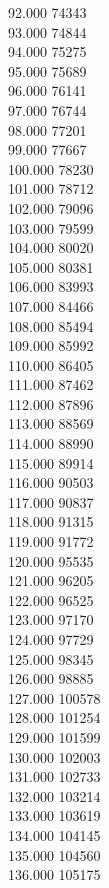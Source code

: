 { 92.000	74343 \\
 93.000	74844 \\
 94.000	75275 \\
 95.000	75689 \\
 96.000	76141 \\
 97.000	76744 \\
 98.000	77201 \\
 99.000	77667 \\
 100.000	78230 \\
 101.000	78712 \\
 102.000	79096 \\
 103.000	79599 \\
 104.000	80020 \\
 105.000	80381 \\
 106.000	83993 \\
 107.000	84466 \\
 108.000	85494 \\
 109.000	85992 \\
 110.000	86405 \\
 111.000	87462 \\
 112.000	87896 \\
 113.000	88569 \\
 114.000	88990 \\
 115.000	89914 \\
 116.000	90503 \\
 117.000	90837 \\
 118.000	91315 \\
 119.000	91772 \\
 120.000	95535 \\
 121.000	96205 \\
 122.000	96525 \\
 123.000	97170 \\
 124.000	97729 \\
 125.000	98345 \\
 126.000	98885 \\
 127.000	100578 \\
 128.000	101254 \\
 129.000	101599 \\
 130.000	102003 \\
 131.000	102733 \\
 132.000	103214 \\
 133.000	103619 \\
 134.000	104145 \\
 135.000	104560 \\
 136.000	105175 \\
}
